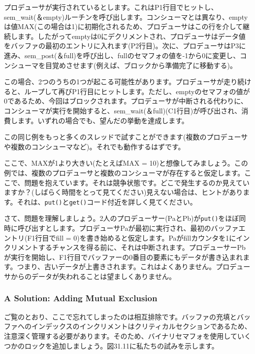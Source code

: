 プロデューサが実行されているとします。これはP1行目でヒットし、sem\_wait(＆empty)ルーチンを呼び出します。コンシューマとは異なり、emptyは値MAX(この場合は1)に初期化されるため、プロデューサはこの行を介して継続します。したがってemptyは0にデクリメントされ、プロデューサはデータ値をバッファの最初のエントリに入れます(P2行目)。次に、プロデューサはP3に進み、sem\_post(＆full)を呼び出し、fullのセマフォの値を-1から0に変更し、コンシューマを目覚めさせます(例えば、ブロックから準備完了に移動する)。

この場合、2つのうちの1つが起こる可能性があります。プロデューサが走り続けると、ループして再びP1行目にヒットします。ただし、emptyのセマフォの値が0であるため、今回はブロックされます。プロデューサが中断される代わりに、コンシューマが実行を開始すると、sem\_wait(＆full)(C1行目)が呼び出され、消費します。いずれの場合でも、望んだの挙動を達成します。

この同じ例をもっと多くのスレッドで試すことができます(複数のプロデューサや複数のコンシューマなど)。それでも動作するはずです。

ここで、MAXが1より大きい(たとえばMAX =
10)と想像してみましょう。この例では、複数のプロデューサと複数のコンシューマが存在すると仮定します。ここで、問題を抱えています。それは競争状態です。どこで発生するのか見えていますか？(しばらく時間をとって見てください)見えない場合は、ヒントがあります。それは、\texttt{put()}と\texttt{get()}コード付近を詳しく見てください。

さて、問題を理解しましょう。2人のプロデューサー(PaとPb)が\texttt{put()}をほぼ同時に呼び出すとします。プロデューサPaが最初に実行され、最初のバッファエントリ(F1行目でfill
=
0)を書き始めると仮定します。Paがfillカウンタを1にインクリメントするチャンスを得る前に、それは中断されます。プロデューサーPbが実行を開始し、F1行目でバッファーの0番目の要素にもデータが書き込まれます。つまり、古いデータが上書きされます。これはよくありません。プロデューサからのデータが失われることは望ましくありません。

\hypertarget{a-solution-adding-mutual-exclusion}{%
\subsubsection*{A Solution: Adding Mutual
Exclusion}\label{a-solution-adding-mutual-exclusion}}

ご覧のとおり、ここで忘れてしまったのは相互排除です。バッファの充填とバッファへのインデックスのインクリメントはクリティカルセクションであるため、注意深く管理する必要があります。そのため、バイナリセマフォを使用していくつかのロックを追加しましょう。図31.11に私たちの試みを示します。

